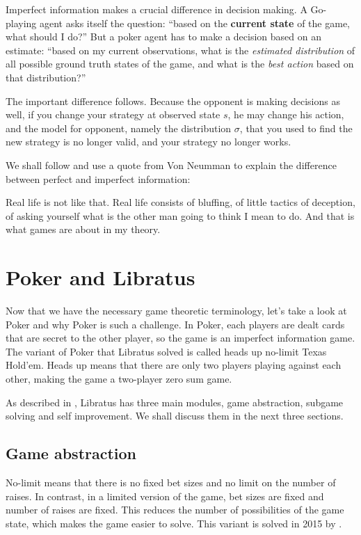 \documentclass[10pt,a4paper]{article}
\begin{document}
Imperfect information makes a crucial difference in decision making. A Go-playing agent asks itself the question: ``based on the \textbf{current state} of the game, what should I do?'' But a poker agent has to make a decision based on an estimate: ``based on my current observations, what is the \textit{estimated distribution} of all possible ground truth states of the game, and what is the \textit{best action} based on that distribution?'' 

 The important difference follows. Because the opponent is making decisions as well, if you change your strategy at observed state $s$, he may change his action, and the model for opponent, namely the distribution $\sigma$, that you used to find the new strategy is no longer valid, and your strategy no longer works. 

We shall follow \cite{bowling2015heads} and use a quote from Von Neumman to explain the difference between perfect and imperfect information:

\begin{displayquote}
	Real life is not like that. Real life consists of bluffing, of little tactics of deception, of asking yourself what is the other man going to think I mean to do. And that is what games are about in my theory.
\end{displayquote}

\newpage
\section{Poker and Libratus}
Now that we have the necessary game theoretic terminology, let's take a look at Poker and why Poker is such a challenge. In Poker, each players are dealt cards that are secret to the other player, so the game is an imperfect information game. The variant of Poker that Libratus solved is called heads up no-limit Texas Hold'em. Heads up means that there are only two players playing against each other, making the game a two-player zero sum game.

As described in \cite{brown2017superhuman}, Libratus has three main modules, game abstraction, subgame solving and self improvement. We shall discuss them in the next three sections.

\subsection{Game abstraction}
No-limit means that there is no fixed bet sizes and no limit on the number of raises. In contrast, in a limited version of the game, bet sizes are fixed and number of raises are fixed. This reduces the number of possibilities of the game state, which makes the game easier to solve. This variant is solved in 2015 by \cite{bowling2015heads}.
\end{document}
